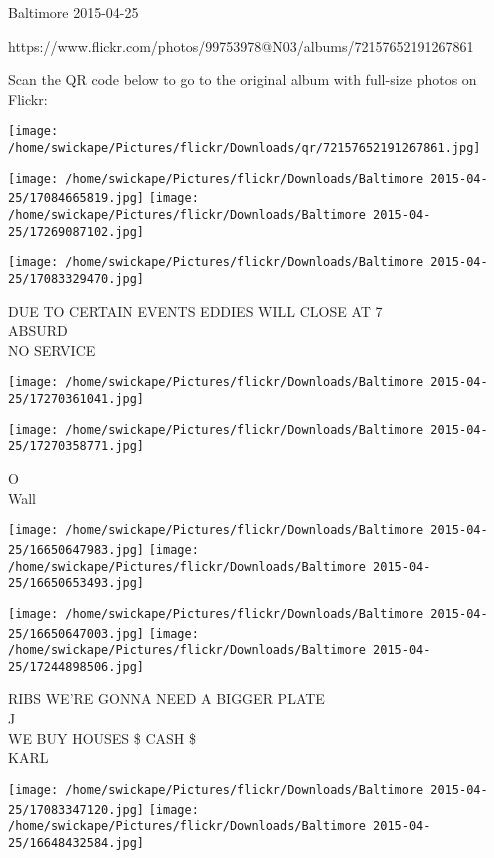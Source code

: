 \documentclass[10pt,letterpaper]{article}
\begin{document}
Baltimore 2015-04-25

https://www.flickr.com/photos/99753978@N03/albums/72157652191267861

Scan the QR code below to go to the original album with full-size photos on Flickr:

\texttt{[image: /home/swickape/Pictures/flickr/Downloads/qr/72157652191267861.jpg]}
\pagebreak

\texttt{[image: /home/swickape/Pictures/flickr/Downloads/Baltimore 2015-04-25/17084665819.jpg]}
\texttt{[image: /home/swickape/Pictures/flickr/Downloads/Baltimore 2015-04-25/17269087102.jpg]}

\texttt{[image: /home/swickape/Pictures/flickr/Downloads/Baltimore 2015-04-25/17083329470.jpg]}

DUE TO CERTAIN EVENTS EDDIES WILL CLOSE AT 7\\
ABSURD\\
NO SERVICE\\
\pagebreak

\texttt{[image: /home/swickape/Pictures/flickr/Downloads/Baltimore 2015-04-25/17270361041.jpg]}

\vspace{0.25in}
\texttt{[image: /home/swickape/Pictures/flickr/Downloads/Baltimore 2015-04-25/17270358771.jpg]}

O\\
Wall\\
\pagebreak

\texttt{[image: /home/swickape/Pictures/flickr/Downloads/Baltimore 2015-04-25/16650647983.jpg]}
\texttt{[image: /home/swickape/Pictures/flickr/Downloads/Baltimore 2015-04-25/16650653493.jpg]}

\texttt{[image: /home/swickape/Pictures/flickr/Downloads/Baltimore 2015-04-25/16650647003.jpg]}
\texttt{[image: /home/swickape/Pictures/flickr/Downloads/Baltimore 2015-04-25/17244898506.jpg]}

RIBS WE'RE GONNA NEED A BIGGER PLATE\\
J\\
WE BUY HOUSES \$ CASH \$\\
KARL\\
\pagebreak

\texttt{[image: /home/swickape/Pictures/flickr/Downloads/Baltimore 2015-04-25/17083347120.jpg]}
\texttt{[image: /home/swickape/Pictures/flickr/Downloads/Baltimore 2015-04-25/16648432584.jpg]}
\end{document}
